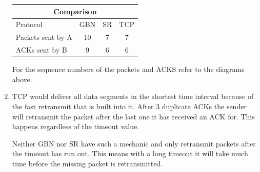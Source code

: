 \documentclass[12pt, a4paper]{article}
\begin{document}
\begin{enumerate}[a]
	\begin{tabular}{|l|c|c|c|}
		\hline
		\multicolumn{4}{|c|}{\textbf{Comparison}}\\\hline
		Protocol & GBN & SR & TCP\\\hline
		\hline
		Packets sent by A & 10 & 7 & 7\\
		ACKs sent by B & 9 & 6 & 6\\\hline
	\end{tabular}

	For the sequence numbers of the packets and ACKS refer to the diagrams above.
	\item %
	TCP would deliver all data segments in the shortest time interval because of the fast retransmit that is built into it. After 3 duplicate ACKs the sender will retransmit the packet after the last one it has received an ACK for. This happens regardless of the timeout value.

	Neither GBN nor SR have such a mechanic and only retransmit packets after the timeout has run out. This means with a long timeout it will take much time before the missing packet is retransmitted.
\end{enumerate}
\end{document}

